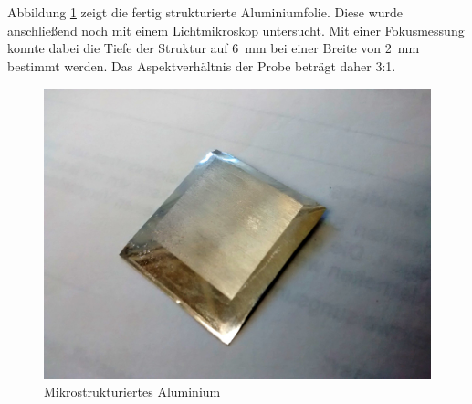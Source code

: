 \documentclass[a4paper, 11pt, headsepline,footsepline,twoside,abstract]{scrbook}
\begin{document}
\\\\
Abbildung \ref{Al_Struktur} zeigt die fertig strukturierte Aluminiumfolie. Diese wurde anschließend noch mit einem Lichtmikroskop untersucht. Mit einer Fokusmessung konnte dabei die Tiefe der Struktur auf \SI{6}{\milli\meter} bei einer Breite von \SI{2}{\milli\meter} bestimmt werden. Das Aspektverhältnis der Probe beträgt daher 3:1.
\begin{figure}[h]
	\centering
	\includegraphics[width=0.85\columnwidth]{images/Al_Struktur.jpg}
	\caption{Mikrostrukturiertes Aluminium}
	\label{Al_Struktur}
\end{figure}
\end{document}
